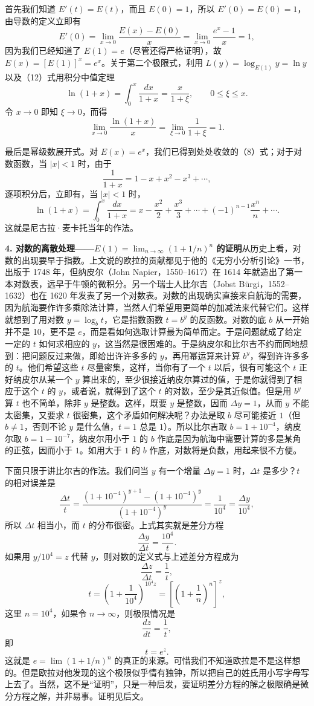 首先我们知道 $E'(t)=E(t)$，而且 $E(0)=1$，所以 $E'(0)=E(0)=1$，由导数的定义立即有
\[
E'(0)=\lim_{x\to0}\frac{E(x)-E(0)}x=\lim_{x\to0}\frac{e^x-1}{x}=1,
\]
因为我们已经知道了 $E(1)=e$（尽管还得严格证明），故 $E(x)=[E(1)]^x=e^x$。关于第二个极限式，利用 $L(y)=\log_{E(1)}y=\ln y$ 以及（12）式用积分中值定理
\[
\ln(1+x)=\int_0^x\frac{dx}{1+x}=\frac{x}{1+\xi},\qquad 0\le\xi\le x.
\]
令 $x\to0$ 即知 $\xi\to0$，而得
\[
\lim_{x\to0}\frac{\ln(1+x)}x=\lim_{\xi\to0}\frac1{1+\xi}=1.
\]

最后是幂级数展开式。对 $E(x)=e^x$，我们已得到处处收敛的（8）式；对于对数函数，当 $|x|<1$ 时，由于
\[
\frac1{1+x}=1-x+x^2-x^3+\cdots,
\]
逐项积分后，立即有，当 $|x|<1$ 时，
\[
\ln(1+x)=\int_0^x\frac{dx}{1+x}=x-\frac{x^2}{2}+\frac{x^3}{3}+\cdots+(-1)^{n-1}\frac{x^n}{n}+\cdots. \tag{14}
\]
这就是尼古拉·麦卡托当年的作法。

\textbf{4. 对数的离散处理——$E(1)=\lim_{n\to\infty}(1+1/n)^n$ 的证明}\quad 从历史上看，对数的出现要早于指数。上文说的欧拉的贡献都见于他的《无穷小分析引论》一书，出版于 1748 年，但纳皮尔（John Napier，1550--1617）在 1614 年就造出了第一本对数表，远早于牛顿的微积分。另一个瑞士人比尔吉（Jobst Bürgi，1552--1632）也在 1620 年发表了另一个对数表。对数的出现确实直接来自航海的需要，因为航海要作许多乘除法计算，当然人们希望用更简单的加减法来代替它们。这样就想到了用对数 $y=\log_b t$，它是指数函数 $t=b^y$ 的反函数。对数的底 $b$ 从一开始并不是 10，更不是 $e$，而是看如何选取计算最为简单而定。于是问题就成了给定一定的 $t$ 如何求相应的 $y$，这当然是很困难的。于是纳皮尔和比尔吉不约而同地想到：把问题反过来做，即给出许许多多的 $y$，再用幂运算来计算 $b^y$，得到许许多多的 $t$。他们希望这些 $t$ 尽量密集，这样，当你有了一个 $t$ 以后，很有可能这个 $t$ 正好纳皮尔从某一个 $y$ 算出来的，至少很接近纳皮尔算过的值，于是你就得到了相应于这个 $t$ 的 $y$，或者说，就得到了这个 $t$ 的对数，至少是其近似值。但是用 $b^y$ 算 $t$ 也不简单，除非 $y$ 是整数。这样，既要 $y$ 是整数，因而 $\Delta y=1$，从而 $y$ 不能太密集，又要求 $t$ 很密集，这个矛盾如何解决呢？办法是取 $b$ 尽可能接近 $1$（但 $b\ne1$，否则不论 $y$ 是什么值，$t=1$ 总是 $1$）。所以比尔吉取 $b=1+10^{-4}$，纳皮尔取 $b=1-10^{-7}$，纳皮尔用小于 $1$ 的 $b$ 作底是因为航海中需要计算的多是某角的正弦，因而小于 $1$。如用大于 $1$ 的 $b$ 作底，对数将是负数，用起来很不方便。

下面只限于讲比尔吉的作法。我们问当 $y$ 有一个增量 $\Delta y=1$ 时，$\Delta t$ 是多少？$t$ 的相对误差是
\[
\frac{\Delta t}{t}=\frac{(1+10^{-4})^{y+1}-(1+10^{-4})^y}{(1+10^{-4})^y}=\frac1{10^4}=\frac{\Delta y}{10^4},
\]
所以 $\Delta t$ 相当小，而 $t$ 的分布很密。上式其实就是差分方程
\[
\frac{\Delta y}{\Delta t}=\frac{10^4}{t}. \tag{15}
\]
如果用 $y/10^4=z$ 代替 $y$，则对数的定义式与上述差分方程成为
\[
\frac{\Delta z}{\Delta t}=\frac1t,
\]
\[
t=\left(1+\frac1{10^4}\right)^{10^4z}=\left[\left(1+\frac1n\right)^n\right]^z, \tag{16}
\]
这里 $n=10^4$，如果令 $n\to\infty$，则极限情况是
\[
\frac{dz}{dt}=\frac1t,
\]
即
\[
t=e^z.
\]
这就是 $e=\lim(1+1/n)^n$ 的真正的来源。可惜我们不知道欧拉是不是这样想的。但是欧拉对他发现的这个极限似乎情有独钟，所以把自己的姓氏用小写字母写上去了。当然，这不是“证明”，只是一种启发，要证明差分方程的解之极限确是微分方程之解，并非易事。证明见后文。

